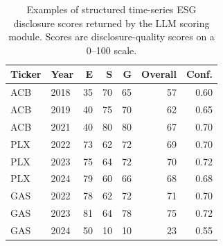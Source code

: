 \begin{table}[t]
\centering
\caption{Examples of structured time-series ESG disclosure scores returned by the LLM scoring module. Scores are disclosure-quality scores on a 0--100 scale.}
\label{tab:time_series_score_examples}
\small
\begin{tabular}{llrrrrr}
\toprule
\textbf{Ticker} & \textbf{Year} & \textbf{E} & \textbf{S} & \textbf{G} & \textbf{Overall} & \textbf{Conf.} \\
\midrule
ACB & 2018 & 35 & 70 & 65 & 57 & 0.60 \\
ACB & 2019 & 40 & 75 & 70 & 62 & 0.65 \\
ACB & 2021 & 40 & 80 & 80 & 67 & 0.70 \\
PLX & 2022 & 73 & 62 & 72 & 69 & 0.70 \\
PLX & 2023 & 75 & 64 & 72 & 70 & 0.72 \\
PLX & 2024 & 79 & 60 & 66 & 68 & 0.68 \\
GAS & 2022 & 78 & 62 & 72 & 71 & 0.70 \\
GAS & 2023 & 81 & 64 & 78 & 75 & 0.72 \\
GAS & 2024 & 50 & 10 & 10 & 23 & 0.55 \\
\bottomrule
\end{tabular}
\end{table}
